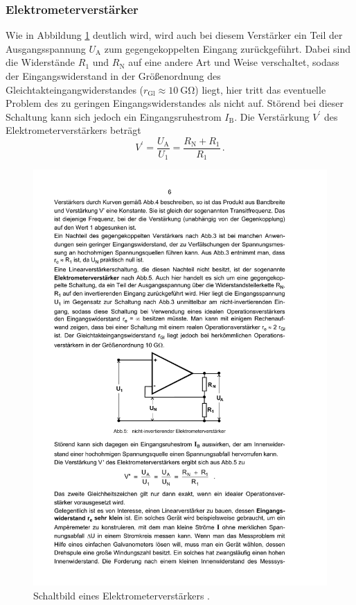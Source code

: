 \subsubsection{Elektrometerverstärker}
\label{subsubsec:elektrometerverstärker}
Wie in Abbildung \ref{fig:elektrometer} deutlich wird, wird auch bei diesem
Verstärker ein Teil der Ausgangsspannung $U_\text{A}$ zum gegengekoppelten
Eingang zurückgeführt. Dabei sind die Widerstände $R_1$ und $R_\text{N}$ auf
eine andere Art und Weise verschaltet, sodass der Eingangswiderstand in der
Größenordnung des Gleichtakteingangwiderstandes
($r_\text{Gl} \approx \SI{10}{\giga\ohm}$) liegt, hier tritt das eventuelle
Problem des zu geringen Eingangswiderstandes als nicht auf.
Störend bei dieser Schaltung kann sich jedoch ein Eingangsruhestrom
$I_\text{B}$.
Die Verstärkung $V^\prime$ des Elektrometerverstärkers beträgt
\begin{equation*}
    V^\prime = \frac{U_\text{A}}{U_1} = \frac{R_\text{N} + R_1}{R_1}\,.
\end{equation*}
\begin{figure}
    \centering
    \includegraphics[width=0.7\linewidth]{img/elektrometer.pdf}
    \caption{Schaltbild eines Elektrometerverstärkers \cite{V51}.}
    \label{fig:elektrometer}
\end{figure}

